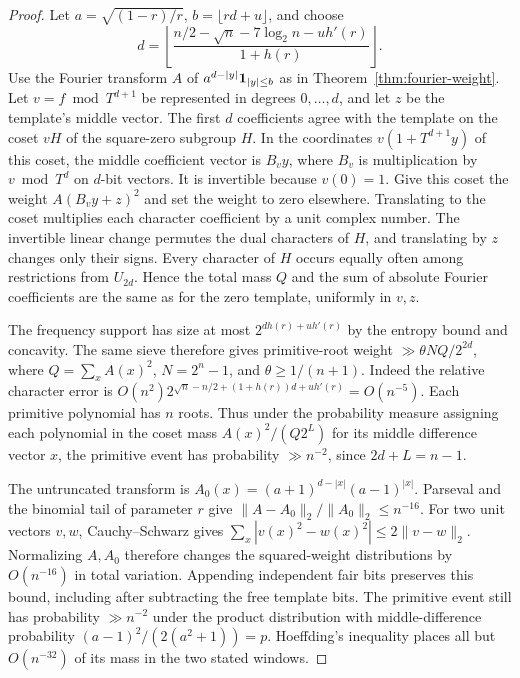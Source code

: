 \documentclass[11pt]{article}
\begin{document}
\begin{proof}
Let \(a=\sqrt{(1-r)/r}\), \(b=\lfloor rd+u\rfloor\), and choose
\[
 d=\left\lfloor
 \frac{n/2-\sqrt n-7\log_2 n-u h'(r)}{1+h(r)}\right\rfloor .
\]
Use the Fourier transform \(A\) of
\(a^{d-|y|}{\bf1}_{|y|\le b}\) as in
Theorem~\ref{thm:fourier-weight}. Let \(v= f\bmod T^{d+1}\)
be represented in degrees \(0,\ldots,d\), and let \(z\) be the
template's middle vector. The first \(d\) coefficients agree with
the template on the coset \(vH\) of the square-zero subgroup \(H\).
In the coordinates \(v(1+T^{d+1}y)\) of this coset, the middle
coefficient vector is \(B_v y\), where \(B_v\) is multiplication by
\(v\bmod T^d\) on \(d\)-bit vectors. It is invertible because
\(v(0)=1\). Give this coset the weight \(A(B_v y+z)^2\) and set
the weight to zero elsewhere. Translating to the coset multiplies
each character coefficient by a unit complex number. The invertible
linear change permutes the dual characters of \(H\), and translating
by \(z\) changes only their signs. Every character of \(H\) occurs
equally often among restrictions from \(U_{2d}\). Hence the total
mass \(Q\) and the sum of absolute Fourier coefficients are the
same as for the zero template, uniformly in \(v,z\).

The frequency support has size at most
\(2^{dh(r)+uh'(r)}\) by the entropy bound and concavity. The same
sieve therefore gives primitive-root weight
\(\gg\theta NQ/2^{2d}\), where \(Q=\sum_x A(x)^2\),
\(N=2^n-1\), and \(\theta\ge1/(n+1)\). Indeed the relative
character error is \(O(n^2)2^{\sqrt n-n/2+(1+h(r))d+uh'(r)}
=O(n^{-5})\). Each primitive polynomial has \(n\) roots. Thus under
the probability measure assigning each polynomial in the coset
mass \(A(x)^2/(Q2^L)\) for its middle difference vector \(x\), the
primitive event has probability \(\gg n^{-2}\),
since \(2d+L=n-1\).

The untruncated transform is \(A_0(x)=(a+1)^{d-|x|}(a-1)^{|x|}\).
Parseval and the binomial tail of parameter \(r\) give
\(\|A-A_0\|_2/\|A_0\|_2\le n^{-16}\).
For two unit vectors \(v,w\), Cauchy--Schwarz gives
\(\sum_x|v(x)^2-w(x)^2|\le2\|v-w\|_2\). Normalizing \(A,A_0\)
therefore changes the squared-weight distributions by \(O(n^{-16})\)
in total variation. Appending independent fair bits preserves this
bound, including after subtracting the free template bits.
The primitive event still has probability \(\gg n^{-2}\)
under the product distribution with middle-difference probability
\((a-1)^2/(2(a^2+1))=p\). Hoeffding's inequality places all but
\(O(n^{-32})\) of its mass in the two stated windows.


\end{proof}
\end{document}
